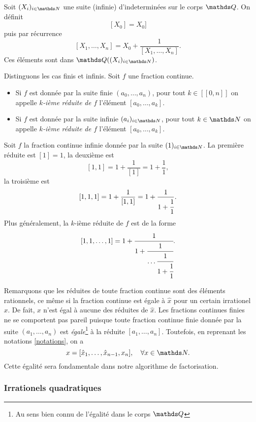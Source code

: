 \begin{definition}
	Soit $(X_i)_{i\in \N}$ une suite (infinie) d'indeterminées sur le corps
	$\Q$. On définit \[[X_0] = X_0]\] puis par récurrence \[[X_1, \dots,
	X_n] = X_0 + \frac{1}{[X_1, \dots, X_n]}.\] Ces éléments sont dans
	$\Q((X_i)_{i\in \N})$.
\end{definition}

\begin{definition}
	Distinguons les cas finis et infinis. Soit $f$ une fraction
	continue.
	\begin{itemize}
		\item Si $f$ est donnée par la suite finie $(a_0, \dots, a_n)$, pour
		tout $k\in [\![0, n]\!]$ on appelle \emph{$k$-ième réduite de $f$}
		l'élément $[a_0, \dots, a_k]$.
		\item Si $f$ est donnée par la suite infinie $(a_i)_{i\in \N}$, pour
		tout $k\in \N$ on appelle \emph{$k$-ième réduite de $f$} l'élément
		$[a_0, \dots, a_k]$.
	\end{itemize}
\end{definition}

\begin{exemple}
	Soit $f$ la fraction continue infinie donnée par la suite $(1)_{i\in \N}$.
	La première réduite est $[1] = 1$, la deuxième est \[[1, 1] = 1 +
	\frac{1}{[1]} = 1 + \frac{1}{1},\] la troisième est \[[1, 1, 1] = 1 +
	\frac{1}{[1, 1]} = 1 + \frac{1}{1 + \cfrac{1}{1}}.\] Plus généralement, la
	$k$-ième réduite de $f$ est de la forme \[[1, 1, \dots, 1] = 1 +
	\cfrac{1}{1 + \cfrac{1}{\dots \\ \cfrac{1}{1 +
	\cfrac{1}{1}}}}.\]
\end{exemple}

Remarquons que les réduites de toute fraction continue sont des éléments
rationnels, ce même si la fraction continue est égale à $\hat{x}$ pour un
certain irrationel $x$. De fait, $x$ n'est égal à aucune des réduites de
$\hat{x}$. Les fractions continues finies ne se comportent pas pareil puisque
toute fraction continue finie donnée par la suite $(a_1, \dots, a_n)$ est
\emph{égale}\footnote{Au sens bien connu de l'égalité dans le corps $\Q$} à la
réduite $[a_1, \dots, a_n]$. Toutefois, en reprenant les notations
\ref{notations}, on a
\begin{equation}
	x = [\hat{x}_1, \dots, \hat{x}_{n-1}, x_n], \quad \forall x\in \N.
\end{equation}
Cette égalité sera fondamentale dans notre algorithme de factorisation.

\subsubsection{Irrationels quadratiques}
